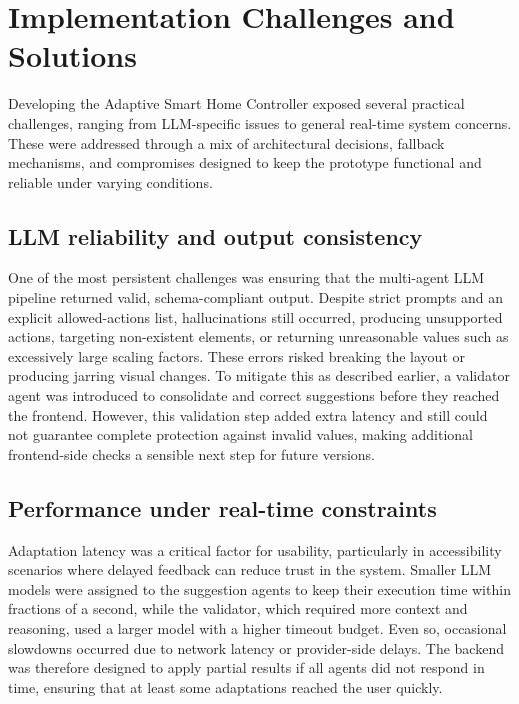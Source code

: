 \documentclass[openany]{book}
\begin{document}
\section{Implementation Challenges and Solutions}
Developing the Adaptive Smart Home Controller exposed several practical challenges, ranging from LLM-specific issues to general real-time system concerns. These were addressed through a mix of architectural decisions, fallback mechanisms, and compromises designed to keep the prototype functional and reliable under varying conditions.

\subsection{LLM reliability and output consistency}
One of the most persistent challenges was ensuring that the multi-agent LLM pipeline returned valid, schema-compliant output. Despite strict prompts and an explicit allowed-actions list, hallucinations still occurred, producing unsupported actions, targeting non-existent elements, or returning unreasonable values such as excessively large scaling factors. These errors risked breaking the layout or producing jarring visual changes. To mitigate this as described earlier, a validator agent was introduced to consolidate and correct suggestions before they reached the frontend. However, this validation step added extra latency and still could not guarantee complete protection against invalid values, making additional frontend-side checks a sensible next step for future versions.

\subsection{Performance under real-time constraints}
Adaptation latency was a critical factor for usability, particularly in accessibility scenarios where delayed feedback can reduce trust in the system. Smaller LLM models were assigned to the suggestion agents to keep their execution time within fractions of a second, while the validator, which required more context and reasoning, used a larger model with a higher timeout budget. Even so, occasional slowdowns occurred due to network latency or provider-side delays. The backend was therefore designed to apply partial results if all agents did not respond in time, ensuring that at least some adaptations reached the user quickly.
\end{document}
